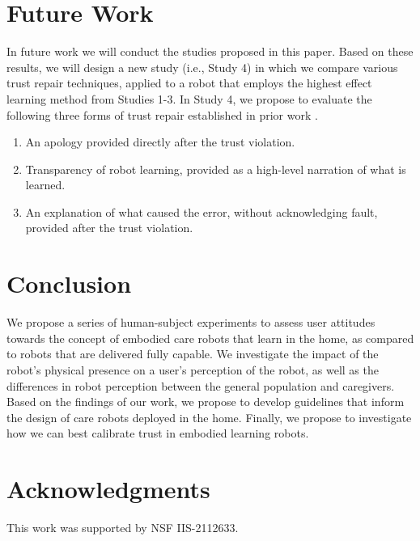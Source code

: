 \documentclass[letterpaper]{article} %
\begin{document}
\section{Future Work}
\label{sec:futurework}
In future work we will conduct the studies proposed in this paper. Based on these results, we will design a new study (i.e., Study 4) in which we compare various trust repair techniques, applied to a robot that employs the highest effect learning method from Studies 1-3. In Study 4, we propose to evaluate the following three forms of trust repair established in prior work \cite{de_visser_towards_2020, baker_toward_2018, robinette_timing_2015, kim_repairing_2013}.

\begin{enumerate}
    \item An apology provided directly after the trust violation.
    \item Transparency of robot learning, provided as a high-level narration of what is learned.
    \item An explanation of what caused the error, without acknowledging fault, provided after the trust violation.
\end{enumerate}

\section{Conclusion}
\label{sec:conclusion}
We propose a series of human-subject experiments to assess user attitudes towards the concept of embodied care robots that learn in the home, as compared to robots that are delivered fully capable. We investigate the impact of the robot's physical presence on a user's perception of the robot, as well as the differences in robot perception between the general population and caregivers. Based on the findings of our work, we propose to develop guidelines that inform the design of care robots deployed in the home. Finally, we propose to investigate how we can best calibrate trust in embodied learning robots.

\section{Acknowledgments}
This work was supported by NSF IIS-2112633.


\end{document}
